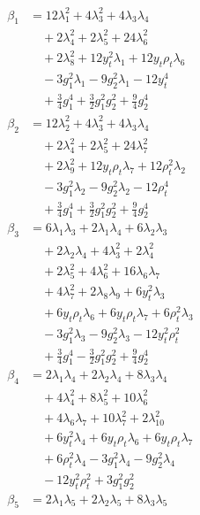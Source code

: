 \documentclass[twocolumn,epjc3]{svjour3}
\begin{document}
\begin{align}
\beta_{1}&=12\lambda_1^2 +4\lambda_3^2 +4\lambda_3\lambda_4\nonumber\\
&\quad +2\lambda_4^2 +2\lambda_5^2 +24\lambda_6^2\nonumber\\
&\quad +2\lambda_8^2 +12y_t^2\lambda_1 +12y_t\rho_t\lambda_6\nonumber\\
&\quad -3g_1^2\lambda_1 -9g_2^2\lambda_1 -12y_t^4\nonumber\\
&\quad +\tfrac{3}{4}g_1^4 +\tfrac{3}{2}g_1^2g_2^2 +\tfrac{9}{4}g_2^4\\
\beta_{2}&=12\lambda_2^2 +4\lambda_3^2 +4\lambda_3\lambda_4\nonumber\\
&\quad +2\lambda_4^2 +2\lambda_5^2 +24\lambda_7^2\nonumber\\
&\quad +2\lambda_9^2 +12y_t\rho_t\lambda_7 +12\rho_t^2\lambda_2\nonumber\\
&\quad -3g_1^2\lambda_2 -9g_2^2\lambda_2 -12\rho_t^4\nonumber\\
&\quad +\tfrac{3}{4}g_1^4 +\tfrac{3}{2}g_1^2g_2^2 +\tfrac{9}{4}g_2^4\\
\beta_{3}&=6\lambda_1\lambda_3 +2\lambda_1\lambda_4 +6\lambda_2\lambda_3\nonumber\\
&\quad +2\lambda_2\lambda_4 +4\lambda_3^2 +2\lambda_4^2\nonumber\\
&\quad +2\lambda_5^2 +4\lambda_6^2 +16\lambda_6\lambda_7\nonumber\\
&\quad +4\lambda_7^2 +2\lambda_8\lambda_9 +6y_t^2\lambda_3\nonumber\\
&\quad +6y_t\rho_t\lambda_6 +6y_t\rho_t\lambda_7 +6\rho_t^2\lambda_3\nonumber\\
&\quad -3g_1^2\lambda_3 -9g_2^2\lambda_3 -12y_t^2\rho_t^2\nonumber\\
&\quad +\tfrac{3}{4}g_1^4 -\tfrac{3}{2}g_1^2g_2^2 +\tfrac{9}{4}g_2^4\\
\beta_{4}&=2\lambda_1\lambda_4 +2\lambda_2\lambda_4 +8\lambda_3\lambda_4\nonumber\\
&\quad +4\lambda_4^2 +8\lambda_5^2 +10\lambda_6^2\nonumber\\
&\quad +4\lambda_6\lambda_7 +10\lambda_7^2 +2\lambda_{10}^2\nonumber\\
&\quad +6y_t^2\lambda_4 +6y_t\rho_t\lambda_6 +6y_t\rho_t\lambda_7\nonumber\\
&\quad +6\rho_t^2\lambda_4 -3g_1^2\lambda_4 -9g_2^2\lambda_4\nonumber\\
&\quad -12y_t^2\rho_t^2 +3g_1^2g_2^2\\
\beta_{5}&=2\lambda_1\lambda_5 +2\lambda_2\lambda_5 +8\lambda_3\lambda_5\nonumber\\

\end{align}
\end{document}

